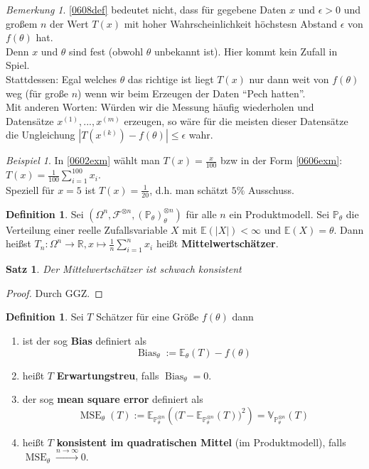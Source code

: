 \documentclass[10pt,a4paper]{article}
\newcommand{\R}{\ensuremath{\mathbb{R}}}
\newcommand{\Prb}{\mathbb P}
\newcommand{\Epv}{\ensuremath{\mathbb{E}}}
\newcommand{\Var}{\mathbb{V}}
\newcommand{\scF}{\ensuremath{\mathscr{F}}}
\newcommand{\Bias}{\operatorname{Bias}}
\newcommand{\MSE}{\operatorname{MSE}}
\theoremstyle{plain}
\newtheorem{satz}[theorem]{Satz}
\theoremstyle{definition}
\newtheorem{definition}[theorem]{Definition}
\theoremstyle{remark}
\newtheorem{bem}[theorem]{Bemerkung}
\newtheorem{exm}[theorem]{Beispiel}
\begin{document}
	\begin{bem}
		\ref{0608def} bedeutet nicht, dass für gegebene Daten $x$ und $\epsilon>0$ und großem $n$ der Wert $T(x)$ mit hoher Wahrscheinlichkeit höchstesn Abstand $\epsilon$ von $f(\theta)$ hat.\\
		Denn $x$ und $\theta$ sind fest (obwohl $\theta$ unbekannt ist). Hier kommt kein Zufall in Spiel.\\
		Stattdessen: Egal welches $\theta$ das richtige ist liegt $T(x)$ nur dann weit von $f(\theta)$ weg (für große $n$) wenn wir beim Erzeugen der Daten \enquote{Pech hatten}.\\
		Mit anderen Worten: Würden wir die Messung häufig wiederholen und Datensätze $x^{(1)},...,x^{(m)}$ erzeugen, so wäre für die meisten dieser Datensätze die Ungleichung $|T(x^{(k)})-f(\theta)|\leq\epsilon$ wahr.
	\end{bem}

	\begin{exm}
		In \ref{0602exm} wählt man $T(x)=\frac{x}{100}$ bzw in der Form \ref{0606exm}: $T(x)=\frac{1}{100}\sum_{i=1}^{100}x_i$.\\
		Speziell für $x=5$ ist $T(x)=\frac{1}{20}$, d.h. man schätzt $5\%$ Ausschuss.
	\end{exm}

	\begin{definition}
		Sei $(\Omega^n,\scF^{\otimes n},(\Prb_\theta)_\theta^{\otimes n})$ für alle $n$ ein Produktmodell. Sei $\Prb_\theta$  die Verteilung einer reelle Zufallsvariable $X$ mit $\Epv(|X|)<\infty$ und $\Epv(X)=\theta$. Dann heißst
		$T_n:\Omega^n\to\R, x\mapsto\frac{1}{n}\sum_{i=1}^{n}x_i$ heißt \textbf{Mittelwertschätzer}.
	\end{definition}
	\addtocounter{theorem}{-1}
	\begin{satz}
		Der Mittelwertschätzer ist schwach konsistent
	\end{satz}
	\begin{proof}
		Durch GGZ.
	\end{proof}

	\begin{definition}
		Sei $T$ Schätzer für eine Größe $f(\theta)$ dann \begin{enumerate}
			\item ist der sog \textbf{Bias} definiert als
			\[\Bias_\theta:=\Epv_\theta(T)-f(\theta)\]
			\item heißt $T$ \textbf{Erwartungstreu}, falls  $\Bias_\theta=0$.
			\item der sog \textbf{mean square error} definiert als
			\[\MSE_\theta(T):=\Epv_{\Prb_\theta^{\otimes n}}\left(\big(T-\Epv_{\Prb_\theta^{\otimes n}}(T)\big)^2\right)=\Var_{\Prb_\theta^{\otimes n}}(T)\]
			\item heißt $T$ \textbf{konsistent im quadratischen Mittel} (im Produktmodell), falls 
			$\MSE_\theta\xrightarrow{n\to\infty}0$.
		\end{enumerate}
	\end{definition}
	
\end{document}
